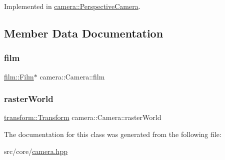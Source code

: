 Implemented in \mbox{\hyperlink{classcamera_1_1PerspectiveCamera_a15d07767da0fb7258437095b6a41f30b}{camera\+::\+Perspective\+Camera}}.



\subsection{Member Data Documentation}
\mbox{\label{classcamera_1_1Camera_a1a21f72f5fae2d27aa020ceac7ce3bac}} 
\subsubsection{\texorpdfstring{film}{film}}
{\footnotesize\ttfamily \mbox{\hyperlink{classfilm_1_1Film}{film\+::\+Film}}$\ast$ camera\+::\+Camera\+::film}

\mbox{\label{classcamera_1_1Camera_a1636f047c45d5960e80796e5f0b2ee89}} 
\subsubsection{\texorpdfstring{rasterWorld}{rasterWorld}}
{\footnotesize\ttfamily \mbox{\hyperlink{classtransform_1_1Transform}{transform\+::\+Transform}} camera\+::\+Camera\+::raster\+World}



The documentation for this class was generated from the following file\+:\begin{DoxyCompactItemize}
\item 
src/core/\mbox{\hyperlink{camera_8hpp}{camera.\+hpp}}\end{DoxyCompactItemize}
